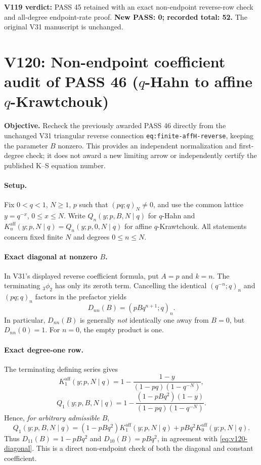 \documentclass[11pt]{article}
\begin{document}
\noindent\textbf{V119 verdict:} PASS 45 retained with an exact non-endpoint reverse-row check and all-degree endpoint-rate proof. \textbf{New PASS: 0; recorded total: 52.} The original V31 manuscript is unchanged.



\clearpage
\section{V120: Non-endpoint coefficient audit of PASS 46 ($q$-Hahn to affine $q$-Krawtchouk)}
\noindent\textbf{Objective.} Recheck the previously awarded PASS 46 directly from the unchanged V31 triangular reverse connection \texttt{eq:finite-affH-reverse}, keeping the parameter $B$ nonzero. This provides an independent normalization and first-degree check; it does not award a new limiting arrow or independently certify the published K--S equation number.

\paragraph{Setup.} Fix $0<q<1$, $N\ge1$, $p$ such that $(pq;q)_N\ne0$, and use the common lattice $y=q^{-x}$, $0\le x\le N$. Write $Q_n(y;p,B,N\mid q)$ for $q$-Hahn and $K_n^{\mathrm{aff}}(y;p,N\mid q)=Q_n(y;p,0,N\mid q)$ for affine $q$-Krawtchouk. All statements concern fixed finite $N$ and degrees $0\le n\le N$.

\paragraph{Exact diagonal at nonzero $B$.} In V31's displayed reverse coefficient formula, put $A=p$ and $k=n$. The terminating ${}_3\phi_2$ has only its zeroth term. Cancelling the identical $(q^{-n};q)_n$ and $(pq;q)_n$ factors in the prefactor yields
\begin{equation}\label{eq:v120-diagonal}
\boxed{D_{nn}(B)=(pBq^{n+1};q)_n.}
\end{equation}
In particular, $D_{nn}(B)$ is generally \emph{not} identically one away from $B=0$, but $D_{nn}(0)=1$. For $n=0$, the empty product is one.

\paragraph{Exact degree-one row.} The terminating defining series gives
\[
K_1^{\mathrm{aff}}(y;p,N\mid q)=1-\frac{1-y}{(1-pq)(1-q^{-N})},
\]
\[
Q_1(y;p,B,N\mid q)=1-\frac{(1-pBq^2)(1-y)}{(1-pq)(1-q^{-N})}.
\]
Hence, \emph{for arbitrary admissible $B$},
\begin{equation}\label{eq:v120-degree-one}
\boxed{Q_1(y;p,B,N\mid q)=(1-pBq^2)K_1^{\mathrm{aff}}(y;p,N\mid q)+pBq^2K_0^{\mathrm{aff}}(y;p,N\mid q).}
\end{equation}
Thus $D_{11}(B)=1-pBq^2$ and $D_{10}(B)=pBq^2$, in agreement with \eqref{eq:v120-diagonal}. This is a direct non-endpoint check of both the diagonal and constant coefficient.
\end{document}
